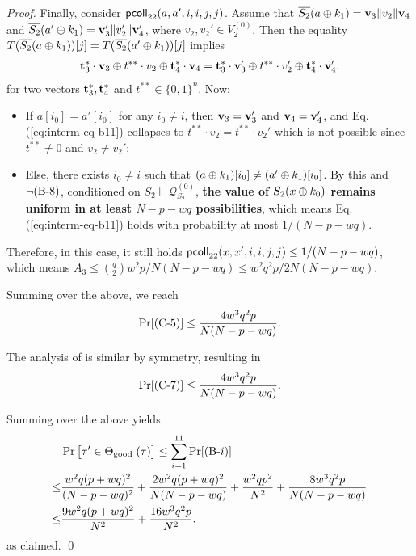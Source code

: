 \begin{proof}
Finally, consider $\mathsf{pcoll}_{22}(a,a',i,i,j,j)$. Assume that $\overline{S_2}(a\oplus k_1)=\mathbf{v}_3\|v_2\|\mathbf{v}_4$ and
$\overline{S_2}(a'\oplus k_1)=\mathbf{v}_3'\|v_2'\|\mathbf{v}_4'$, where $v_2,v_2'\in V_2^{(0)}$. Then the equality $T(\overline{S_2}(a\oplus k_1))[j]=T(\overline{S_2}(a'\oplus k_1))[j]$ implies
%
\begin{align}
\mathbf{t}_3^*\cdot\mathbf{v}_3\oplus t^{**}\cdot v_2\oplus\mathbf{t}_4^*\cdot\mathbf{v}_4=\mathbf{t}_3^*\cdot\mathbf{v}_3'\oplus t^{**}\cdot v_2'\oplus\mathbf{t}_4^*\cdot\mathbf{v}_4'.
\label{eq:interm-eq-b11}
\end{align}
%
%
for two vectors $\mathbf{t}_3^*,\mathbf{t}_4^*$ and $t^{**}\in\{0,1\}^n$. Now:
\begin{itemize}
	\item If $a[i_0]=a'[i_0]$ for any $i_0\neq i$, then $\mathbf{v}_3=\mathbf{v}_3'$ and $\mathbf{v}_4=\mathbf{v}_4'$, and Eq. (\ref{eq:interm-eq-b11}) collapses to $t^{**}\cdot v_2=t^{**}\cdot v_2'$ which is not possible since $t^{**}\neq 0$ and $v_2\neq v_2'$;
	\item Else, there exists $i_0\neq i$ such that $(a\oplus k_1)[i_0]\neq(a'\oplus k_1)[i_0]$. By this and $\neg\text{(B-8)}$, conditioned on $S_2\vdash\mathcal{Q}_{S_2}^{(0)}$, {\bf the value of $S_2(x\oplus k_0)$ remains uniform in at least $N-p-wq$ possibilities}, which means Eq. (\ref{eq:interm-eq-b11}) holds with probability at most $1/(N-p-wq)$.
\end{itemize}
Therefore, in this case, it still holds $\mathsf{pcoll}_{22}(x,x',i,i,j,j)\leq1/(N-p-wq)$, which means $A_3\leq{q\choose2}w^2p/N(N-p-wq)\leq w^2q^2p/2N(N-p-wq)$.



Summing over the above, we reach
%
$$\Pr[\text{(C-5)}]\leq\frac{4w^3q^2p}{N(N-p-wq)}.$$
%

The analysis of \cseven is similar by symmetry, resulting in
%
%
$$\Pr[\text{(C-7)}]\leq\frac{4w^3q^2p}{N(N-p-wq)}.$$
%



\arrangespace


Summing over the above yields
%
\begin{align*}
&  \Pr\big[ \tau' \in \Theta_{\text {good }}(\tau)\big]  \leq \sum_{i=1}^{11}\Pr[\text{(B-}i)]       \\
\leq  & \frac{w^2 q (p+w q)^{2}}{(N-p-wq)^{2}}+
\frac{2w^2 q (p+w q)^{2}}{N  (N-p-wq)}+
\frac{w^2qp^2}{N^2}+
\frac{8w^3q^2p}{N(N-p-wq)}      \\
\leq  & \frac{9w^2 q (p+w q)^{2}}{N^2}+ \frac{16w^3q^2p}{N^2} .
\end{align*}
%
as claimed.        \qed
\end{proof}









